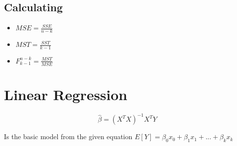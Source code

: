 \documentclass{article}
\begin{document}
\subsection{Calculating}
\begin{itemize}
  \item $MSE = \frac{SSE}{n-k}$
  \item $MST = \frac{SST}{k-1}$
  \item $F^{n-k}_{k-1} = \frac{MST}{MSE}$
\end{itemize}

\section{Linear Regression}
\begin{equation}
  \hat{\beta} = (X^TX)^{-1}X^TY
\end{equation}

Is the basic model from the given equation
$E[Y] = \beta_0x_0 + \beta_1x_1+ ... + \beta_kx_k$
\end{document}

